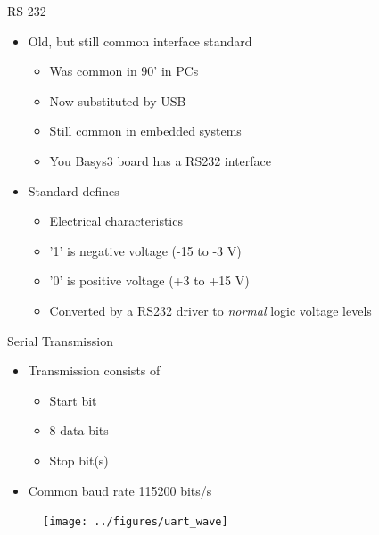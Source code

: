 \begin{frame}[fragile]{RS 232}
\begin{itemize}
\item Old, but still common interface standard
\begin{itemize}
\item Was common in 90' in PCs
\item Now substituted by USB
\item Still common in embedded systems
\item You Basys3 board has a RS232 interface
\end{itemize}
\item Standard defines
\begin{itemize}
\item Electrical characteristics
\item '1' is negative voltage (-15 to -3 V)
\item '0' is positive voltage (+3 to +15 V)
\item Converted by a RS232 driver to \emph{normal} logic voltage levels
\end{itemize}
\end{itemize}
\end{frame}


\begin{frame}[fragile]{Serial Transmission}
\begin{itemize}
\item Transmission consists of
\begin{itemize}
\item Start bit
\item 8 data bits
\item Stop bit(s)
\end{itemize}
\item Common baud rate 115200 bits/s
\end{itemize}
\begin{figure}
  \texttt{[image: ../figures/uart\_wave]}
\end{figure}
\end{frame}


